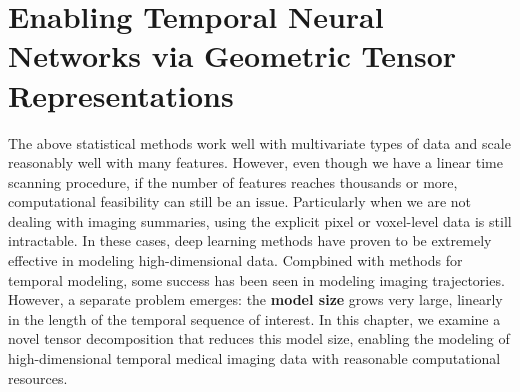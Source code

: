 \chapter{Enabling Temporal Neural Networks via Geometric Tensor Representations} \label{chap:ott} 

The above statistical methods work well with
multivariate types of data and scale reasonably well with many features.
However,
even though we have a linear time scanning procedure,
if the number of features reaches thousands or more,
computational feasibility can still be an issue.
Particularly when we are not dealing with
imaging summaries,
using the explicit pixel or voxel-level
data is still intractable.
In these cases,
deep learning methods have
proven to be extremely effective
in modeling high-dimensional data.
Compbined with methods
for temporal modeling,
some success has been seen
in modeling imaging trajectories.
However, a separate problem
emerges: the \textbf{model size}
grows very large, linearly 
in the length of the temporal sequence of interest.
In this chapter, we examine
a novel tensor decomposition
that reduces this model size,
enabling the modeling of high-dimensional
temporal medical imaging data
with reasonable computational resources.


%




